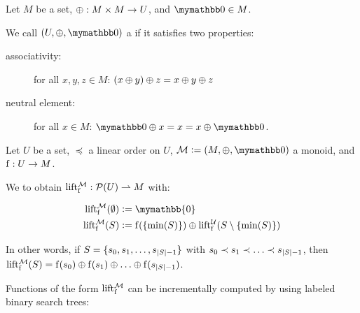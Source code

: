 \begin{definition}
Let $M$ be a set, $\oplus: M \times M \rightarrow U$, and $\neutraladd \in M$.

We call $(U, \groupaddsym, \neutraladd)$ a  if it satisfies two properties:

  \begin{description}
    \item[associativity:] for all $x, y, z \in M$: ${({x} \oplus {y})} \oplus {z} = {x} \oplus {{y} \oplus{z}}$
    \item[neutral element:] for all $x \in M$: $\groupadd{\neutraladd}{x} = x = \groupadd{x}{\neutraladd}$.
  \end{description}
\end{definition}

\begin{definition}
\label{def-lift}
Let $U$ be a set, $\preceq$ a linear order on $U$, $\mathcal{M} \defeq (M, \groupaddsym, \neutraladd)$ a monoid, and ${\operatorname{f}}: {U} \rightarrow {M}$.

We  to obtain ${\operatorname{lift_{\operatorname{f}}^{\mathcal{M}}}}: {\mathcal{P}({U})} \rightharpoonup{M}$ with:

\begin{align*}
\lift{\f}{\mathcal{M}}(\emptyset) &\defeq \mymathbb{0}\\
\lift{\f}{\mathcal{M}}(S) &\defeq \f(\set{\min(S)}) \oplus \lift{\f}{\mathcal{U}}(S \setminus \set{\min(S)})\\
\end{align*}

In other words, if $S = \{s_0, s_1, \ldots, s_{|{S}| - 1}\}$ with $s_0 \prec s_1 \prec \ldots \prec s_{|{S}| - 1}$, then $\operatorname{lift_{\operatorname{f}}^{\mathcal{M}}}(S) = {\operatorname{f}(s_0)} \oplus {{\operatorname{f}(s_1)} \oplus{{\ldots} \oplus{\operatorname{f}(s_{|{S}| - 1})}}}$.
\end{definition}

Functions of the form $\operatorname{lift_{\operatorname{f}}^{\mathcal{M}}}$ can be incrementally computed by using labeled binary search trees:

